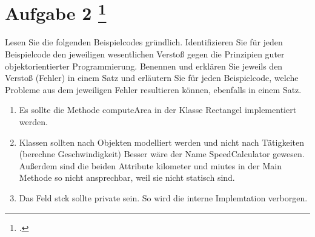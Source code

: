 \documentclass{lehramt-informatik-aufgabe}
\begin{document}
\section{Aufgabe 2
\footcite{66116:2021:03}}

Lesen Sie die folgenden Beispielcodes gründlich. Identifizieren Sie für
jeden Beispielcode den jeweiligen wesentlichen Verstoß gegen die
Prinzipien guter objektorientierter Programmierung. Benennen und
erklären Sie jeweils den Verstoß (Fehler) in einem Satz und erläutern
Sie für jeden Beispielcode, welche Probleme aus dem jeweiligen Fehler
resultieren können, ebenfalls in einem Satz.

\begin{enumerate}
\item {}

\begin{liAntwort}
Es sollte die Methode computeArea in der Klasse Rectangel implementiert
werden.
\end{liAntwort}

\item {}

\begin{liAntwort}
Klassen sollten nach Objekten modelliert werden und nicht nach
Tätigkeiten (berechne Geschwindigkeit) Besser wäre der Name
SpeedCalculator gewesen. Außerdem sind die beiden Attribute kilometer
und miutes in der Main Methode so nicht ansprechbar, weil sie nicht
statisch sind.
\end{liAntwort}

\item {}

\begin{liAntwort}
Das Feld stck sollte private sein. So wird die interne Implemtation
verborgen.
\end{liAntwort}
\end{enumerate}
\end{document}
